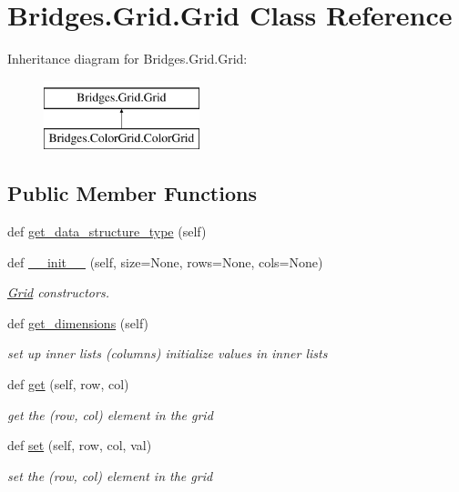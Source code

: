 \hypertarget{class_bridges_1_1_grid_1_1_grid}{}\section{Bridges.\+Grid.\+Grid Class Reference}
\label{class_bridges_1_1_grid_1_1_grid}
Inheritance diagram for Bridges.\+Grid.\+Grid\+:\begin{figure}[H]
\begin{center}
\leavevmode
\includegraphics[height=2.000000cm]{class_bridges_1_1_grid_1_1_grid}
\end{center}
\end{figure}
\subsection*{Public Member Functions}
\begin{DoxyCompactItemize}
\item 
def \mbox{\hyperlink{class_bridges_1_1_grid_1_1_grid_ac3ee98a6b4b9c743f2116f7c855f3fd3}{get\+\_\+data\+\_\+structure\+\_\+type}} (self)
\item 
def \mbox{\hyperlink{class_bridges_1_1_grid_1_1_grid_a5a0a993fcdb28d59bfc32024a7dea0ae}{\+\_\+\+\_\+init\+\_\+\+\_\+}} (self, size=None, rows=None, cols=None)
\begin{DoxyCompactList}\small\item\em \mbox{\hyperlink{class_bridges_1_1_grid_1_1_grid}{Grid}} constructors. \end{DoxyCompactList}\item 
def \mbox{\hyperlink{class_bridges_1_1_grid_1_1_grid_af077067d396e080403231f5834dbdbb0}{get\+\_\+dimensions}} (self)
\begin{DoxyCompactList}\small\item\em set up inner lists (columns) initialize values in inner lists \end{DoxyCompactList}\item 
def \mbox{\hyperlink{class_bridges_1_1_grid_1_1_grid_ae4848ca073fcc0b8e657b2bd5cd5efa4}{get}} (self, row, col)
\begin{DoxyCompactList}\small\item\em get the (row, col) element in the grid \end{DoxyCompactList}\item 
def \mbox{\hyperlink{class_bridges_1_1_grid_1_1_grid_a85ead00286be2a6947637f2665dfe973}{set}} (self, row, col, val)
\begin{DoxyCompactList}\small\item\em set the (row, col) element in the grid \end{DoxyCompactList}\end{DoxyCompactItemize}
